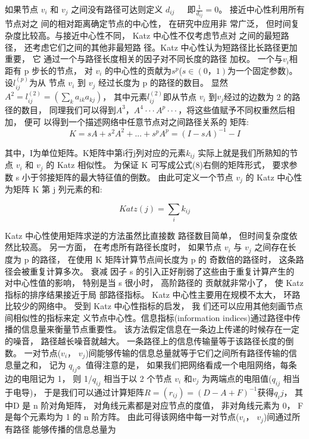 				如果节点  $v_i$  和  $v_j$  之间没有路径可达则定义 $d_{ij}$  ， 即$\frac{1}{d_{ij}}=0$。 接近中心性利用所有节点对之 间的相对距离确定节点的中心性， 在研究中应用非 常广泛， 但时间复杂度比较高。与接近中心性不同， Katz 中心性不仅考虑节点对 之间的最短路径， 还考虑它们之间的其他非最短路 径\parencite{Katz1953A}。Katz 中心性认为短路径比长路径更加重要， 它 通过一个与路径长度相关的因子对不同长度的路径 加权。 一个与$v_i$相距有 p 步长的节点， 对 $v_i$ 的中心性的贡献为$s^p$($s\in(0，1)$为一个固定参数)。 设$l_{ij}^{(p)}$为从 节点 $v_i$ 到 $v_j$ 经过长度为 p 的路径的数目。 显然 $A^2 =l_{ij}^{(2)}=(\sum\limits_k {a_{ik}a_{kj}})$， 其中元素$l_{ij}^{(2)}$即从节点 $v_i$ 到$v_j$经过的边数为 2 的路径的数目， 同理我们可以得到$A^3， A^4···A^p···， $将这些值赋予不同权重然后相加， 便可 以得到一个描述网络中任意节点对之间路径关系的 矩阵:
\[K = sA + {s^2}{A^2} + ... + {s^p}{A^p} = {(I - sA)^{ - 1}} - I\]

				其中，I为单位矩阵。K矩阵中第i行j列对应的元素$k_{ij}$ 实际上就是我们所熟知的节点 $v_i$ 和 $v_j$ 的 Katz 相似性\parencite{L2011Link}。 为保证 K 可写成公式(8)右侧的矩阵形式， 要求参数 s 小于邻接矩阵的最大特征值的倒数。 由此可定义一个节点 $v_j$ 的 Katz 中心性为矩阵 K 第 j 列元素的和:

				$$Katz(j)=\sum\limits_i {k_{ij}}$$

				Katz 中心性使用矩阵求逆的方法虽然比直接数 路径数目简单， 但时间复杂度依然比较高。 另一方面， 在考虑所有路径长度时， 如果节点 $v_i$ 与 $v_j$ 之间存在长 度为 p 的路径， 在使用 K 矩阵计算节点间长度为 p 的 奇数倍的路径时， 这条路径会被重复计算多次。 衰减 因子 s 的引入正好削弱了这些由于重复计算产生的 对中心性值的影响， 特别是当 s 很小时， 高阶路径的 贡献就非常小了， 使 Katz 指标的排序结果接近于局 部路径指标。 Katz 中心性主要用在规模不太大， 环路 比较少的网络中。 受到 Katz 中心性指标的启发， 我 们还可以应用其他刻画节点间相似性的指标\parencite{L2011Link}来定 义节点中心性。信息指标(information indices)\parencite{Stephenson1989Rethinking}通过路径中传播的信息量来衡量节点重要性。 该方法假定信息在一条边上传递的时候存在一定的噪音， 路径越长噪音就越大。 一条路径上的信息传输量等于该路径长度的倒数。 一对节点($v_i$， $v_j$)间能够传输的信息总量就等于它们之间所有路径传输的信息量之和， 记为 $q_{ij}$。值得注意的是， 如果我们把网络看成一个电阻网络，每条边的电阻记为 1， 则 1/$q_{ij}$ 相当于以 2 个节点 $v_i$ 和$v_j$ 为两端点的电阻值($q_{ij}$ 相当于电导)\parencite{Altmann1993Reinterpreting}， 于是我们可以通过计算矩阵$R=(r_{ij})=(D-A+F)^{-1}$获得$q_ij$， 其中D 是 n 阶对角矩阵， 对角线元素都是对应节点的度值， 非对角线元素为 0， F 是每个元素均为 1 的 n 阶方阵。 由此可得该网络中每一对节点($v_i$， $v_j$)间通过所有路径 能够传播的信息总量为

